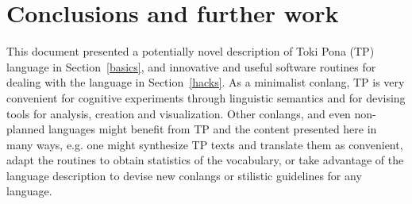 \documentclass{article}
\begin{document}
\section{Conclusions and further work}\label{conc}
This document presented a potentially novel description of Toki Pona (TP)
language in Section~\ref{basics}, and innovative and useful software routines for dealing with
the language in Section~\ref{hacks}.
As a minimalist conlang, TP is very convenient for cognitive
experiments
through linguistic semantics and
for devising tools for analysis, creation and visualization.
Other conlangs, and even non-planned languages might benefit from
TP and the content presented here in many ways, e.g. one might
synthesize TP texts and translate them as convenient,
adapt the routines to obtain statistics of the vocabulary,
or take advantage of the language description to devise new conlangs
or stilistic guidelines for any language.
\end{document}
